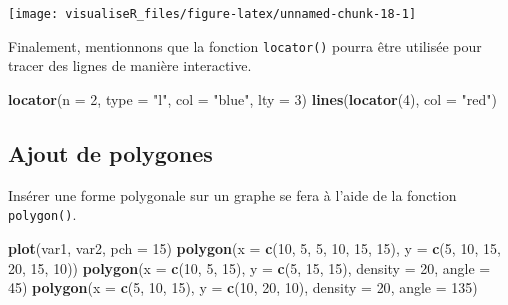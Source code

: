 \documentclass[]{article}
\newenvironment{Shaded}{\begin{snugshade}}{\end{snugshade}}
\newcommand{\DataTypeTok}[1]{\textcolor[rgb]{0.13,0.29,0.53}{#1}}
\newcommand{\DecValTok}[1]{\textcolor[rgb]{0.00,0.00,0.81}{#1}}
\newcommand{\KeywordTok}[1]{\textcolor[rgb]{0.13,0.29,0.53}{\textbf{#1}}}
\newcommand{\NormalTok}[1]{#1}
\newcommand{\StringTok}[1]{\textcolor[rgb]{0.31,0.60,0.02}{#1}}
\begin{document}
\begin{center}\texttt{[image: visualiseR\_files/figure-latex/unnamed-chunk-18-1]} \end{center}

Finalement, mentionnons que la fonction \texttt{locator()} pourra être utilisée pour tracer des lignes de manière interactive.

\begin{Shaded}
\begin{Highlighting}[]
\KeywordTok{locator}\NormalTok{(}\DataTypeTok{n =} \DecValTok{2}\NormalTok{, }\DataTypeTok{type =} \StringTok{"l"}\NormalTok{, }\DataTypeTok{col =} \StringTok{"blue"}\NormalTok{, }\DataTypeTok{lty =} \DecValTok{3}\NormalTok{)}
\KeywordTok{lines}\NormalTok{(}\KeywordTok{locator}\NormalTok{(}\DecValTok{4}\NormalTok{), }\DataTypeTok{col =} \StringTok{"red"}\NormalTok{)}
\end{Highlighting}
\end{Shaded}

\hypertarget{ajout-de-polygones}{%
\subsection{Ajout de polygones}\label{ajout-de-polygones}}

Insérer une forme polygonale sur un graphe se fera à l'aide de la fonction \texttt{polygon()}.

\begin{Shaded}
\begin{Highlighting}[]
\KeywordTok{plot}\NormalTok{(var1, var2, }\DataTypeTok{pch =} \DecValTok{15}\NormalTok{)}
\KeywordTok{polygon}\NormalTok{(}\DataTypeTok{x =} \KeywordTok{c}\NormalTok{(}\DecValTok{10}\NormalTok{, }\DecValTok{5}\NormalTok{, }\DecValTok{5}\NormalTok{, }\DecValTok{10}\NormalTok{, }\DecValTok{15}\NormalTok{, }\DecValTok{15}\NormalTok{), }\DataTypeTok{y =} \KeywordTok{c}\NormalTok{(}\DecValTok{5}\NormalTok{, }\DecValTok{10}\NormalTok{, }\DecValTok{15}\NormalTok{, }\DecValTok{20}\NormalTok{, }\DecValTok{15}\NormalTok{, }\DecValTok{10}\NormalTok{))}
\KeywordTok{polygon}\NormalTok{(}\DataTypeTok{x =} \KeywordTok{c}\NormalTok{(}\DecValTok{10}\NormalTok{, }\DecValTok{5}\NormalTok{, }\DecValTok{15}\NormalTok{), }\DataTypeTok{y =} \KeywordTok{c}\NormalTok{(}\DecValTok{5}\NormalTok{, }\DecValTok{15}\NormalTok{, }\DecValTok{15}\NormalTok{), }\DataTypeTok{density =} \DecValTok{20}\NormalTok{, }\DataTypeTok{angle =} \DecValTok{45}\NormalTok{)}
\KeywordTok{polygon}\NormalTok{(}\DataTypeTok{x =} \KeywordTok{c}\NormalTok{(}\DecValTok{5}\NormalTok{, }\DecValTok{10}\NormalTok{, }\DecValTok{15}\NormalTok{), }\DataTypeTok{y =} \KeywordTok{c}\NormalTok{(}\DecValTok{10}\NormalTok{, }\DecValTok{20}\NormalTok{, }\DecValTok{10}\NormalTok{), }\DataTypeTok{density =} \DecValTok{20}\NormalTok{, }\DataTypeTok{angle =} \DecValTok{135}\NormalTok{)}
\end{Highlighting}
\end{Shaded}
\end{document}
